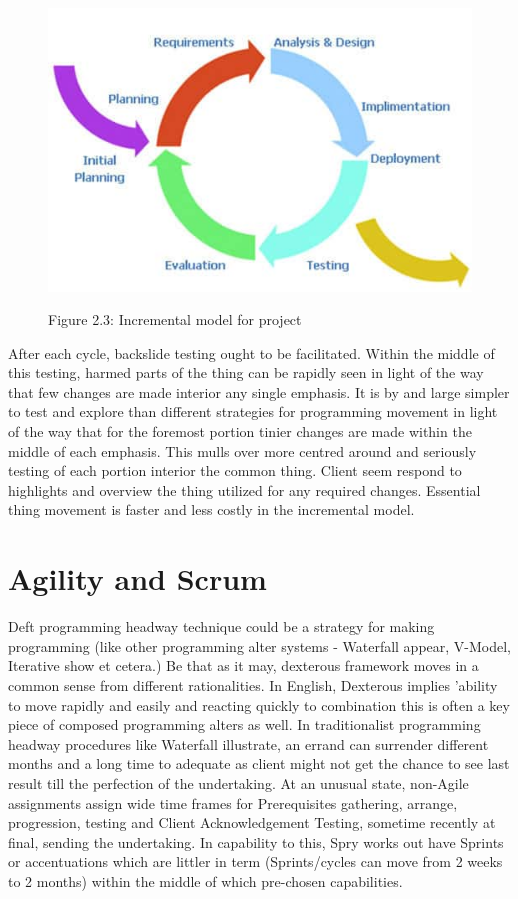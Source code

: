 \documentclass{book}
\begin{document}
    	
    	\begin{figure}
    		\includegraphics[]{images/cycle.png}
    		
    		\begin{center}
    			Figure 2.3: Incremental model for project
    		\end{center}
    	\end{figure}
    	After each cycle, backslide testing ought to be facilitated. Within the middle of this testing, harmed parts of the thing can be rapidly seen in light of the way that few changes are made interior any single emphasis. It is by and large simpler to test and explore than different strategies for programming movement in light of the way that for the foremost portion tinier changes are made within the middle of each emphasis. This mulls over more centred around and seriously testing of each portion interior the common thing. Client seem respond to highlights and overview the thing utilized for any required changes. Essential thing movement is faster and less costly in the incremental model.
    	
    	\section{Agility and Scrum}
    	Deft programming headway technique could be a strategy for making programming (like other programming alter systems - Waterfall appear, V-Model, Iterative show et cetera.) Be that as it may, dexterous framework moves in a common sense from different rationalities. In English, Dexterous implies 'ability to move rapidly and easily and reacting quickly to combination this is often a key piece of composed programming alters as well.
    	In traditionalist programming headway procedures like Waterfall illustrate, an errand can surrender different months and a long time to adequate as client might not get the chance to see last result till the perfection of the undertaking. At an unusual state, non-Agile assignments assign wide time frames for Prerequisites gathering, arrange, progression, testing and Client Acknowledgement Testing, sometime recently at final, sending the undertaking. In capability to this, Spry works out have Sprints or accentuations which are littler in term (Sprints/cycles can move from 2 weeks to 2 months) within the middle of which pre-chosen capabilities.
    	
\end{document}
